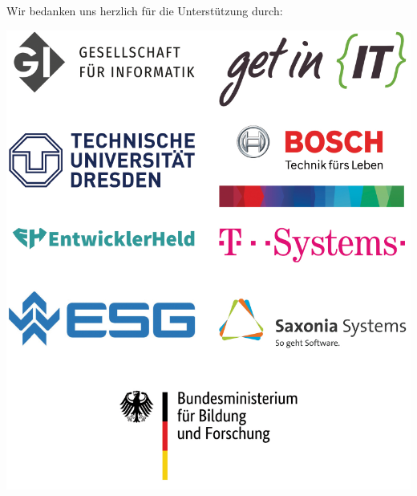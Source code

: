 Wir bedanken uns herzlich für die Unterstützung durch:
\begin{center}
\includegraphics[width=.9\textwidth,keepaspectratio]{img/Sponsorenseite_ohne_infineon}
\end{center}
